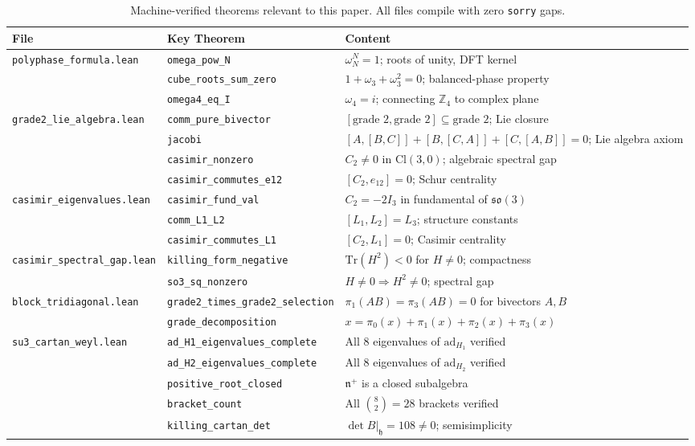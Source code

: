 \documentclass[11pt]{article}
\newcommand{\so}{\mathfrak{so}}
\newcommand{\h}{\mathfrak{h}}
\newcommand{\Cl}{\mathrm{Cl}}
\newcommand{\ad}{\mathrm{ad}}
\newcommand{\Tr}{\mathrm{Tr}}
\newcommand{\ZZ}{\mathbb{Z}}
\begin{document}
\begin{table}[t]
\centering
\caption{Machine-verified theorems relevant to this paper. All files
  compile with zero \texttt{sorry} gaps.}
\label{tab:proofs}
\small
\begin{tabular}{@{}llp{6cm}@{}}
\toprule
\textbf{File} & \textbf{Key Theorem} & \textbf{Content} \\
\midrule
\texttt{polyphase\_formula.lean}
  & \texttt{omega\_pow\_N}
  & $\omega_N^N = 1$; roots of unity, DFT kernel \\
  & \texttt{cube\_roots\_sum\_zero}
  & $1 + \omega_3 + \omega_3^2 = 0$; balanced-phase property \\
  & \texttt{omega4\_eq\_I}
  & $\omega_4 = i$; connecting $\ZZ_4$ to complex plane \\
\midrule
\texttt{grade2\_lie\_algebra.lean}
  & \texttt{comm\_pure\_bivector}
  & $[\text{grade 2}, \text{grade 2}] \subseteq \text{grade 2}$; Lie closure \\
  & \texttt{jacobi}
  & $[A,[B,C]] + [B,[C,A]] + [C,[A,B]] = 0$; Lie algebra axiom \\
  & \texttt{casimir\_nonzero}
  & $C_2 \neq 0$ in $\Cl(3,0)$; algebraic spectral gap \\
  & \texttt{casimir\_commutes\_e12}
  & $[C_2, e_{12}] = 0$; Schur centrality \\
\midrule
\texttt{casimir\_eigenvalues.lean}
  & \texttt{casimir\_fund\_val}
  & $C_2 = -2 I_3$ in fundamental of $\so(3)$ \\
  & \texttt{comm\_L1\_L2}
  & $[L_1, L_2] = L_3$; structure constants \\
  & \texttt{casimir\_commutes\_L1}
  & $[C_2, L_1] = 0$; Casimir centrality \\
\midrule
\texttt{casimir\_spectral\_gap.lean}
  & \texttt{killing\_form\_negative}
  & $\Tr(H^2) < 0$ for $H \neq 0$; compactness \\
  & \texttt{so3\_sq\_nonzero}
  & $H \neq 0 \Rightarrow H^2 \neq 0$; spectral gap \\
\midrule
\texttt{block\_tridiagonal.lean}
  & \texttt{grade2\_times\_grade2\_selection}
  & $\pi_1(AB) = \pi_3(AB) = 0$ for bivectors $A, B$ \\
  & \texttt{grade\_decomposition}
  & $x = \pi_0(x) + \pi_1(x) + \pi_2(x) + \pi_3(x)$ \\
\midrule
\texttt{su3\_cartan\_weyl.lean}
  & \texttt{ad\_H1\_eigenvalues\_complete}
  & All 8 eigenvalues of $\ad_{H_1}$ verified \\
  & \texttt{ad\_H2\_eigenvalues\_complete}
  & All 8 eigenvalues of $\ad_{H_2}$ verified \\
  & \texttt{positive\_root\_closed}
  & $\mathfrak{n}^+$ is a closed subalgebra \\
  & \texttt{bracket\_count}
  & All $\binom{8}{2} = 28$ brackets verified \\
  & \texttt{killing\_cartan\_det}
  & $\det B|_{\h} = 108 \neq 0$; semisimplicity \\
\bottomrule
\end{tabular}
\end{table}
\end{document}
